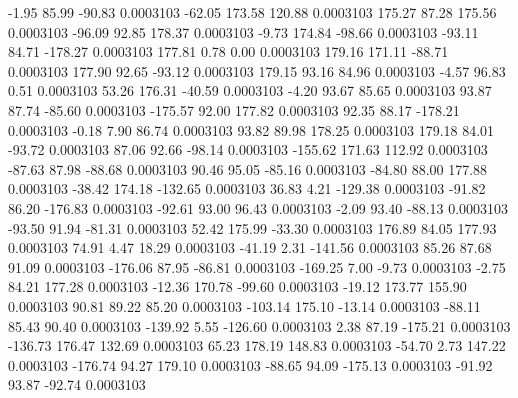        -1.95       85.99      -90.83     0.0003103
      -62.05      173.58      120.88     0.0003103
      175.27       87.28      175.56     0.0003103
      -96.09       92.85      178.37     0.0003103
       -9.73      174.84      -98.66     0.0003103
      -93.11       84.71     -178.27     0.0003103
      177.81        0.78        0.00     0.0003103
      179.16      171.11      -88.71     0.0003103
      177.90       92.65      -93.12     0.0003103
      179.15       93.16       84.96     0.0003103
       -4.57       96.83        0.51     0.0003103
       53.26      176.31      -40.59     0.0003103
       -4.20       93.67       85.65     0.0003103
       93.87       87.74      -85.60     0.0003103
     -175.57       92.00      177.82     0.0003103
       92.35       88.17     -178.21     0.0003103
       -0.18        7.90       86.74     0.0003103
       93.82       89.98      178.25     0.0003103
      179.18       84.01      -93.72     0.0003103
       87.06       92.66      -98.14     0.0003103
     -155.62      171.63      112.92     0.0003103
      -87.63       87.98      -88.68     0.0003103
       90.46       95.05      -85.16     0.0003103
      -84.80       88.00      177.88     0.0003103
      -38.42      174.18     -132.65     0.0003103
       36.83        4.21     -129.38     0.0003103
      -91.82       86.20     -176.83     0.0003103
      -92.61       93.00       96.43     0.0003103
       -2.09       93.40      -88.13     0.0003103
      -93.50       91.94      -81.31     0.0003103
       52.42      175.99      -33.30     0.0003103
      176.89       84.05      177.93     0.0003103
       74.91        4.47       18.29     0.0003103
      -41.19        2.31     -141.56     0.0003103
       85.26       87.68       91.09     0.0003103
     -176.06       87.95      -86.81     0.0003103
     -169.25        7.00       -9.73     0.0003103
       -2.75       84.21      177.28     0.0003103
      -12.36      170.78      -99.60     0.0003103
      -19.12      173.77      155.90     0.0003103
       90.81       89.22       85.20     0.0003103
     -103.14      175.10      -13.14     0.0003103
      -88.11       85.43       90.40     0.0003103
     -139.92        5.55     -126.60     0.0003103
        2.38       87.19     -175.21     0.0003103
     -136.73      176.47      132.69     0.0003103
       65.23      178.19      148.83     0.0003103
      -54.70        2.73      147.22     0.0003103
     -176.74       94.27      179.10     0.0003103
      -88.65       94.09     -175.13     0.0003103
      -91.92       93.87      -92.74     0.0003103
